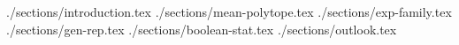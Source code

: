 \documentclass[a4paper,11pt,twoside,english]{article}
\numberwithin{equation}{section}
\begin{document}
    \maketitle

    \begin{abstract}%
        
    \end{abstract}

    {./sections/introduction.tex}
    {./sections/mean-polytope.tex}
    {./sections/exp-family.tex}
    {./sections/gen-rep.tex}
    {./sections/boolean-stat.tex}
    {./sections/outlook.tex}



    \vskip 0.2in

    
\end{document}
